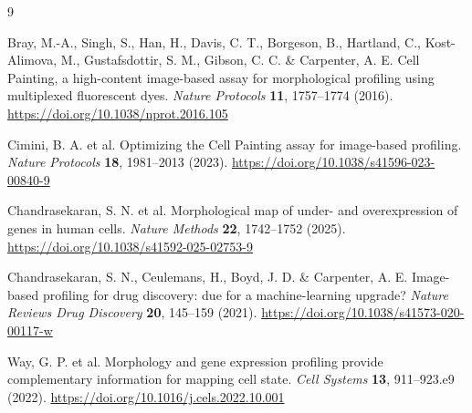 \documentclass[11pt]{article}
\begin{document}
\begin{thebibliography}{9}

Bray, M.-A., Singh, S., Han, H., Davis, C. T., Borgeson, B., Hartland, C.,
Kost-Alimova, M., Gustafsdottir, S. M., Gibson, C. C. \& Carpenter, A. E.
\newblock Cell Painting, a high-content image-based assay for morphological profiling using multiplexed fluorescent dyes.
\newblock \emph{Nature Protocols} \textbf{11}, 1757--1774 (2016).
\newblock \url{https://doi.org/10.1038/nprot.2016.105}

Cimini, B. A. et al.
\newblock Optimizing the Cell Painting assay for image-based profiling.
\newblock \emph{Nature Protocols} \textbf{18}, 1981--2013 (2023).
\newblock \url{https://doi.org/10.1038/s41596-023-00840-9}

Chandrasekaran, S. N. et al.
\newblock Morphological map of under- and overexpression of genes in human cells.
\newblock \emph{Nature Methods} \textbf{22}, 1742--1752 (2025).
\newblock \url{https://doi.org/10.1038/s41592-025-02753-9}

Chandrasekaran, S. N., Ceulemans, H., Boyd, J. D. \& Carpenter, A. E.
\newblock Image-based profiling for drug discovery: due for a machine-learning upgrade?
\newblock \emph{Nature Reviews Drug Discovery} \textbf{20}, 145--159 (2021).
\newblock \url{https://doi.org/10.1038/s41573-020-00117-w}

Way, G. P. et al.
\newblock Morphology and gene expression profiling provide complementary information for mapping cell state.
\newblock \emph{Cell Systems} \textbf{13}, 911--923.e9 (2022).
\newblock \url{https://doi.org/10.1016/j.cels.2022.10.001}

\end{thebibliography}
\end{document}
